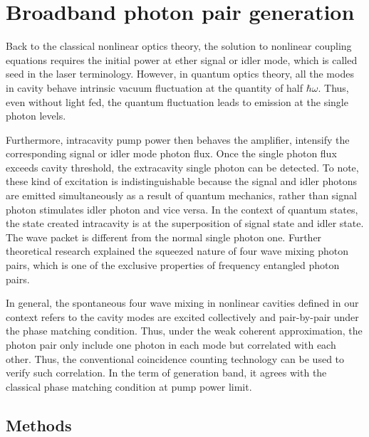 \chapter{Broadband photon pair generation}\label{chap:7}

Back to the classical nonlinear optics theory, the solution to nonlinear coupling equations requires the initial power at ether signal or idler mode, which is called seed in the laser terminology. However, in quantum optics theory, all the modes in cavity behave intrinsic vacuum fluctuation at the quantity of half $ \hbar \omega $. Thus, even without light fed, the quantum fluctuation leads to emission at the single photon levels. 

Furthermore, intracavity pump power then behaves the amplifier, intensify the corresponding signal or idler mode photon flux. Once the single photon flux exceeds cavity threshold, the extracavity single photon can be detected. To note, these kind of excitation is indistinguishable because the signal and idler photons are emitted simultaneously as a result of quantum mechanics, rather than signal photon stimulates idler photon and vice versa. In the context of quantum states, the state created intracavity is at the superposition of signal state and idler state. The wave packet is different from the normal single photon one. Further theoretical research \cite{Scully1997} explained the squeezed nature of four wave mixing photon pairs, which is one of the exclusive properties of frequency entangled photon pairs.

In general, the spontaneous four wave mixing in nonlinear cavities defined in our context refers to the cavity modes are excited collectively and pair-by-pair under the phase matching condition. Thus, under the weak coherent approximation, the photon pair only include one photon in each mode but correlated with each other. Thus, the conventional coincidence counting technology can be used to verify such correlation. In the term of generation band, it agrees with the classical phase matching condition at pump power limit.


\section{Methods}

